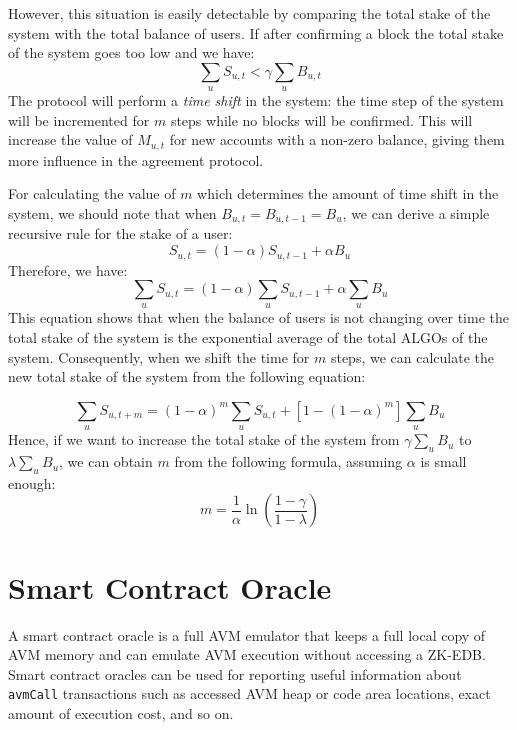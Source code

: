 \documentclass[11pt, A4]{report}
\begin{document}
    However, this situation is easily detectable by comparing the total stake of the system with the total balance of
    users. If after confirming a block the total stake of the system goes too low and we have:
    \[
        \sum_{u}S_{u,t} < \gamma \sum_{u}B_{u,t}
    \]
    The protocol will perform a \emph{time shift} in the system: the time step of the system
    will be incremented for \(m\) steps while no blocks will be confirmed. This will increase the value of \(M_{u,t}\)
    for new accounts with a non-zero balance, giving them more influence in the agreement protocol.

    For calculating the value of \(m\) which determines the amount of time shift in the system, we should note that when
    \(B_{u,t} = B_{u, t-1} = B_u\), we can derive a simple recursive rule for the stake of a user:
    \[
        S_{u,t} = (1 - \alpha) S_{u,t-1} + \alpha B_u
    \]
    Therefore, we have:
    \[
        \sum_{u}S_{u,t} = (1 - \alpha) \sum_{u}S_{u,t - 1} + \alpha \sum_{u}B_u
    \]
    This equation shows that when the balance of users is not changing over time the total stake of the system is the
    exponential average of the total ALGOs of the system. Consequently, when we shift the time for \(m\) steps, we can
    calculate the new total stake of the system from the following equation:

    \[
        \sum_{u}S_{u,t+m} = (1 - \alpha)^{m}\sum_{u}S_{u,t} + [1 - (1 - \alpha)^{m}]\sum_{u}B_u
    \]
    Hence, if we want to increase the total stake of the system from \(\gamma \sum_{u}B_u\) to \(\lambda \sum_{u}B_u\),
    we can obtain \(m\) from the following formula, assuming \(\alpha\) is small enough:
    \[
        m = \frac{1}{\alpha} \ln \left(\frac{1 - \gamma}{1 - \lambda}\right)
    \]


    \section{Smart Contract Oracle}\label{sec:smart-contract-oracle}

    A smart contract oracle is a full AVM emulator that keeps a full local copy of AVM memory and can emulate AVM
    execution without accessing a ZK-EDB. Smart contract oracles can be used for reporting useful information about
    \texttt{avmCall} transactions such as accessed AVM heap or code area locations, exact amount of execution cost,
    and so on.
\end{document}
